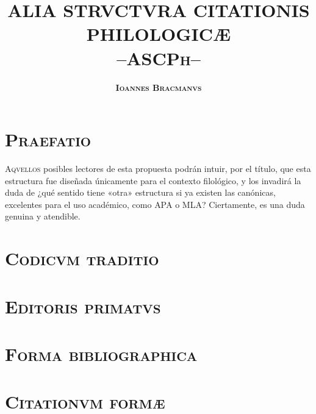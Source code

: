 \documentclass[11pt,twoside]{article}
\title{\huge \textbf{ALIA STRVCTVRA CITATIONIS PHILOLOGICÆ}\\ \textsc{\huge\textbf{--ASCPh--}}}
\date{}
\author{\huge\textsc{\textbf{Ioannes Bracmanvs}}}
\begin{document}
		{
		\maketitle
	}
	\newpage
%
\section*{\centering\textsc{Praefatio}}
%
\textsc{Aqvellos} posibles lectores de esta propuesta podrán intuir, por el título, que esta estructura fue diseñada únicamente para el contexto filológico, y los invadirá la duda de ¿qué sentido tiene «otra» estructura si ya existen las canónicas, excelentes para el uso académico, como APA o MLA? Ciertamente, es una duda genuina y atendible.
%
\section*{\centering\textsc{Codicvm traditio}}
%
%
\section*{\centering\textsc{Editoris primatvs}}
%
%
\section*{\centering\textsc{Forma bibliographica}}
%
%
\section*{\centering\textsc{Citationvm formæ}}
%
%
\end{document}

